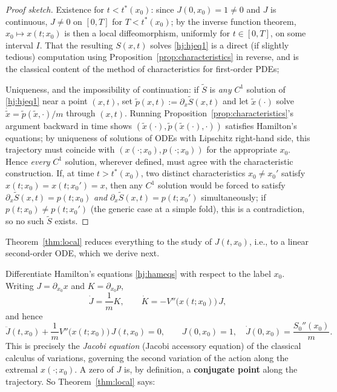 \begin{proof}[Proof sketch]
Existence for $t<t^\ast(x_0)$: since $J(0,x_0)=1\ne0$ and $J$ is continuous,
    $J\ne0$ on $[0,T]$ for $T<t^\ast(x_0)$; by the inverse function theorem,
    $x_0\mapsto x(t;x_0)$ is then a local diffeomorphism, uniformly for
    $t\in[0,T]$, on some interval $I$. That the resulting $S(x,t)$ solves
    \eqref{hj:hjeq1} is a direct (if slightly tedious) computation using
    Proposition~\ref{prop:characteristics} in reverse, and is the classical
    content of the method of characteristics for first-order PDEs; 

Uniqueness, and the impossibility of continuation: if $\tilde S$ is \emph{any}
    $C^1$ solution of \eqref{hj:hjeq1} near a point $(x,t)$, set $\tilde
    p(x,t):=\partial_x\tilde S(x,t)$ and let $\tilde x(\cdot)$ solve
    $\dot{\tilde x}=\tilde p(\tilde x,\cdot)/m$ through $(x,t)$. Running
    Proposition~\ref{prop:characteristics}'s argument backward in time shows
    $(\tilde x(\cdot),\tilde p(\tilde x(\cdot),\cdot))$ satisfies Hamilton's
    equations; by uniqueness of solutions of ODEs with Lipschitz right-hand
    side, this trajectory must coincide with $(x(\cdot;x_0),p(\cdot;x_0))$ for
    the appropriate $x_0$. Hence \emph{every} $C^1$ solution, wherever defined,
    must agree with the characteristic construction. If, at time
    $t>t^\ast(x_0)$, two distinct characteristics $x_0\ne x_0'$ satisfy
    $x(t;x_0)=x(t;x_0')=x$, then any $C^1$ solution would be forced to satisfy
    $\partial_x\tilde S(x,t) = p(t;x_0)$ \emph{and} $\partial_x\tilde
    S(x,t)=p(t;x_0')$ simultaneously; if $p(t;x_0)\ne p(t;x_0')$ (the generic
    case at a simple fold), this is a contradiction, so no such $\tilde S$
    exists.
\end{proof}

Theorem~\ref{thm:local} reduces everything to the study of $J(t,x_0)$, i.e., to
a linear second-order ODE, which we derive next.


Differentiate Hamilton's equations \eqref{hj:hameqs} with respect to the label
$x_0$. Writing $J=\partial_{x_0}x$ and $K=\partial_{x_0}p$,
\[
\dot J = \frac{1}{m}K, \qquad \dot K = -V''\big(x(t;x_0)\big)\,J,
\]
and hence
\begin{equation}
\ddot J(t,x_0) + \frac{1}{m}V''\big(x(t;x_0)\big)\,J(t,x_0) = 0, 
    \qquad J(0,x_0)=1, \quad \dot J(0,x_0) = \frac{S_0''(x_0)}{m}.
\label{hj:jacobi}
\end{equation}
This is precisely the \emph{Jacobi equation} (Jacobi accessory equation) of the
classical calculus of variations, governing the second variation of the action
along the extremal $x(\cdot;x_0)$.  A zero of $J$ is, by definition, a
\textbf{conjugate point} along the trajectory. So Theorem~\ref{thm:local} says:

